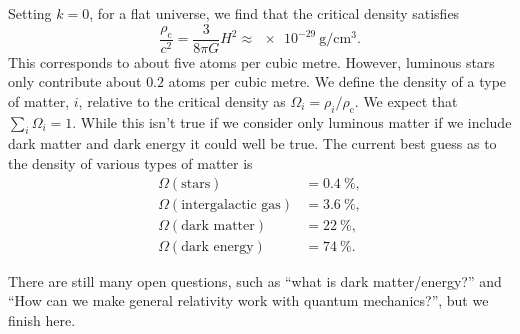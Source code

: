 \documentclass[fleqn]{NotesClass}
\begin{document}
    Setting \(k = 0\), for a flat universe, we find that the critical density satisfies
    \begin{equation}
        \frac{\rho_{\mathrm{c}}}{c^2} = \frac{3}{8\pi G} H^2 \approx \qty{e-29}{\gram\per\centi\metre\cubed}.
    \end{equation}
    This corresponds to about five atoms per cubic metre.
    However, luminous stars only contribute about \(0.2\) atoms per cubic metre.
    We define the density of a type of matter, \(i\), relative to the critical density as \(\Omega_i = \rho_i/\rho_{\mathrm{c}}\).
    We expect that \(\sum_i \Omega_i = 1\).
    While this isn't true if we consider only luminous matter if we include dark matter and dark energy it could well be true.
    The current best guess as to the density of various types of matter is
    \begin{align}
        \Omega(\text{stars}) &= \qty{0.4}{\percent},\\
        \Omega(\text{intergalactic gas}) &= \qty{3.6}{\percent},\\
        \Omega(\text{dark matter}) &= \qty{22}{\percent},\\
        \Omega(\text{dark energy}) &= \qty{74}{\percent}.
    \end{align}
    
    There are still many open questions, such as \enquote{what is dark matter/energy?} and \enquote{How can we make general relativity work with quantum mechanics?}, but we finish here.
    
    
    \backmatter
    \renewcommand{\glossaryname}{Acronyms}
    \printglossary[acronym]
    \printindex
\end{document}
